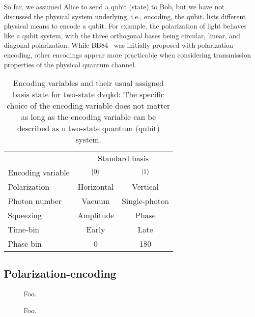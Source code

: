So far, we assumed Alice to send a qubit (state) to Bob, but we have not discussed the physical system underlying, i.e., encoding, the qubit.
 lists different physical means to encode a qubit.
For example, the polarization of light behaves like a qubit system, with the three orthogonal bases being circular, linear, and diagonal polarization.
While BB84~\cite{Bennett1984} was initially proposed with polarization-encoding, other encodings appear more practicable when considering transmission properties of the physical quantum channel.
\begin{table}[htb]
	\centering	
	\begin{tabular}{lcc}
		\toprule
		& \multicolumn{2}{c}{Standard basis} \\
		\cmidrule{2-3}
		Encoding variable & $\ket{0}$ & $\ket{1}$ \\
		\midrule
		Polarization & Horizontal & Vertical \\
		Photon number & Vacuum & Single-photon \\
		Squeezing & Amplitude & Phase \\
		Time-bin & Early & Late \\
		Phase-bin & \SI{0}{\deg} & \SI{180}{\deg} \\
		\bottomrule
	\end{tabular}
	\caption{Encoding variables and their usual assigned basis state for two-state \gls{dvqkd}: The specific choice of the encoding variable does not matter as long as the encoding variable can be described as a two-state quantum (qubit) system.}\label{tab:dvqkd_encodings}
\end{table}

\FloatBarrier
\subsection{Polarization-encoding}

\begin{figure}[htb]
	\centering
	
	\caption{Foo.}
\end{figure}
\begin{figure}[htb]
	\centering
	
	\caption{Foo.}
\end{figure}

